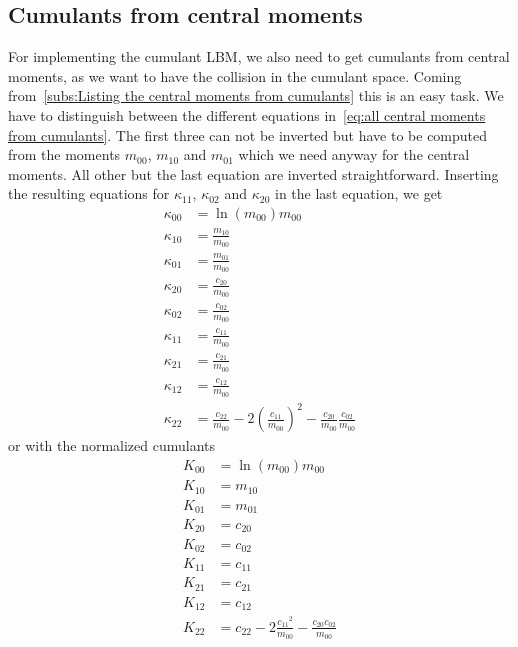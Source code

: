 \documentclass{article}
\begin{document}
\subsection{Cumulants from central moments}
\label{sub:Cumulants from central moments}
For implementing the cumulant LBM, we also need to get cumulants from central moments, as we want to have the collision in the cumulant space. Coming from~\ref{subs:Listing the central moments from cumulants} this is an easy task. We have to distinguish between the different equations in~\eqref{eq:all central moments from cumulants}.
The first three can not be inverted but have to be computed from the moments $m_{00}$, $m_{10}$ and $m_{01}$ which we need anyway for the central moments. All other but the last equation are inverted straightforward.
Inserting the resulting equations for $\kappa_{11}$, $\kappa_{02}$ and $\kappa_{20}$ in the last equation, we get
\begin{equation}
  \label{eq:all cumulants from central moments}
  \begin{aligned}
    \kappa_{00} & = \ln(m_{00})m_{00} \\
    \kappa_{10} & = \frac{m_{10}}{m_{00}} \\
    \kappa_{01} & = \frac{m_{01}}{m_{00}} \\
    \kappa_{20} & = \frac{c_{20}}{m_{00}} \\
    \kappa_{02} & = \frac{c_{02}}{m_{00}} \\
    \kappa_{11} & = \frac{c_{11}}{m_{00}} \\
    \kappa_{21} & = \frac{c_{21}}{m_{00}} \\
    \kappa_{12} & = \frac{c_{12}}{m_{00}} \\
    \kappa_{22} & = \frac{c_{22}}{m_{00}} - 2{\left(\frac{c_{11}}{m_{00}}\right)}^2 - \frac{c_{20}}{m_{00}}\frac{c_{02}}{m_{00}}
  \end{aligned}
\end{equation}
%
or with the normalized cumulants
\begin{equation}
  \begin{aligned}
    \label{eq:all normalized cumulants from central moments}
    K_{00} & = \ln(m_{00})m_{00} \\
    K_{10} & = m_{10} \\
    K_{01} & = m_{01} \\
    K_{20} & = c_{20} \\
    K_{02} & = c_{02} \\
    K_{11} & = c_{11} \\
    K_{21} & = c_{21} \\
    K_{12} & = c_{12} \\
    K_{22} & = c_{22} - 2 \frac{{c_{11}}^2}{m_{00}} - \frac{c_{20}c_{02}}{m_{00}}
  \end{aligned}
\end{equation}
\end{document}
